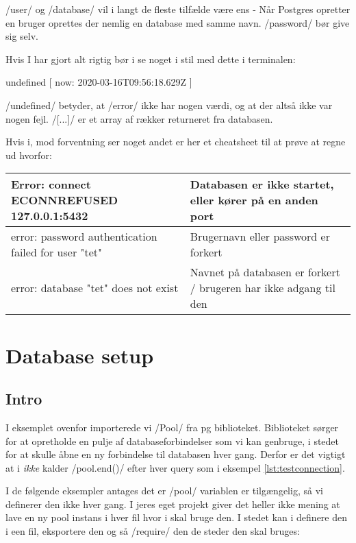 \documentclass[english,course]{lecture}
\begin{document}
\jsinline/user/ og \jsinline/database/ vil i langt de fleste tilfælde være ens - Når Postgres opretter en bruger oprettes der nemlig en database med samme navn. \jsinline/password/ bør give sig selv.


Hvis I har gjort alt rigtig bør i se noget i stil med dette i terminalen:

\begin{bashcode}
undefined [ { now: 2020-03-16T09:56:18.629Z } ]
\end{bashcode}

\jsinline/undefined/ betyder, at \jsinline/error/ ikke har nogen værdi, og at der altså ikke var nogen fejl. \jsinline/[...]/ er et array af rækker returneret fra databasen.

Hvis i, mod forventning ser noget andet er her et cheatsheet til at prøve at regne ud hvorfor:

\begin{table}[h]
\begin{tabular}{|p{6cm}|p{6cm}|}
\hline
Error: connect ECONNREFUSED 127.0.0.1:5432           & Databasen er ikke startet, eller kører på en anden port           \\ \hline
error: password authentication failed for user "tet" & Brugernavn eller password er forkert                              \\ \hline
error: database "tet" does not exist                 & Navnet på databasen er forkert / brugeren har ikke adgang til den \\ \hline
\end{tabular}
\end{table}

\section{Database setup}
\subsection{Intro}

I eksemplet ovenfor importerede vi \jsinline/Pool/ fra pg biblioteket. Biblioteket sørger for at opretholde en pulje af databaseforbindelser som vi kan genbruge, i stedet for at skulle åbne en ny forbindelse til databasen hver gang. Derfor er det vigtigt at i \textit{ikke} kalder \jsinline/pool.end()/ efter hver query som i eksempel \ref{lst:testconnection}.

I de følgende eksempler antages det er \jsinline/pool/ variablen er tilgængelig, så vi definerer den ikke hver gang. I jeres eget projekt giver det heller ikke mening at lave en ny pool instans i hver fil hvor i skal bruge den. I stedet kan i definere den i een fil, eksportere den og så \jsinline/require/ den de steder den skal bruges:
\end{document}

